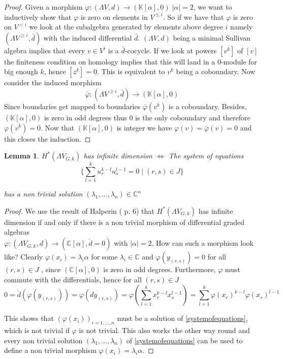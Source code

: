 \documentclass[12pt,a4paper]{scrartcl}
\newtheorem{Lemma}[Theorem]{Lemma}
\numberwithin{equation}{section}
\newcommand{\C}{\mathbb{C}} %
\newcommand{\K}{\mathbb{K}} %
\newcommand{\Sullivan}{(\Lambda V,d)}
\begin{document}
 \begin{proof}
 Given a morphism  $ \varphi : \Sullivan \to (\K[\alpha],0) \; |\alpha| = 2 $, we want to inductively show that
 $\varphi$ is zero on elements in $V^{\leq i}$. So if we have that $\varphi$ is zero on $V^{< i}$ we look at the
 subalgebra generated by elements above degree $i$ namely $(\Lambda V^{\geq i} , \bar{d})$ with the induced differential $\bar{d}$.
 $\Sullivan$ being a minimal Sullivan algebra implies that every $ v \in V^i$ is a $\bar{d}$-cocycle. If we look at powers
 $[v^k]$ of $[v]$ the finiteness condition on homology implies that this will land in a $0$-module for big enough $k$, hence 
 $[z^k] = 0$. This is equivalent to $v^k$ being a coboundary. Now consider the induced morphism
 $$ \bar{\varphi} \colon (\Lambda V^{\geq i} , \bar{d}) \to (\K[\alpha],0)$$
 Since boundaries get mapped to boundaries $\bar{\varphi}(v^k)$ is a coboundary. Besides, $(\K[\alpha],0)$ is zero in odd degrees thus
 $0$ is the only coboundary and therefore $\varphi(v^k) = 0$. Now that $(\K[\alpha],0)$ is integer we have 
 $\varphi(v)= \bar{\varphi}(v) = 0$ and this closes the induction.
   
 \end{proof}

 
\begin{Lemma}
\label{lma:cohomoly+equations}
 $H^*(\Lambda V_{G,k})$ has infinite dimension $\iff$ The system of equations \\
 \begin{equation}
 \label{systemofequations}
 {\lbrace \sum_{l = 1}^k u_r^{k - l} u_s^{l - 1} = 0 \; | \; (r,s) \in J \rbrace}  
 \end{equation}
 
 has a non trivial solution 
 $(\lambda_1 , \dotsc, \lambda_n) \in \C^n$
\end{Lemma}

\begin{proof}
 We use the result of Halperin (\cite{Halperin1988} p. 6) that $H^*(\Lambda V_{G,k})$ has infinite dimension if and only if %
 there is a non trivial morphism of differential graded algebras \\
 ${\varphi \colon (\Lambda V_{G,k},d) \to ( \C [\alpha] ,\acute{d} = 0)}$ with $|\alpha| = 2$. How can such a morphism look like?
 Clearly $\varphi(x_i) = \lambda_i \alpha$ for some $\lambda_i \in \C$ and $\varphi(y_{(r,s)}) = 0$ for all $(r,s) \in J$ , since 
 $(\C [\alpha] , 0)$ is zero in odd degrees. Furthermore, $\varphi$ must commute with the differentials, hence 
 for all $(r,s) \in J$
 $$ 0 = \acute{d} (\varphi(y_{(r,s)})) = \varphi(dy_{(r,s)}) = \varphi(\sum_{l = 1}^k x_r^{k -l} x_s^{l - 1})
 = \sum_{l = 1}^k \varphi(x_r)^{k -l} \varphi(x_s)^{l - 1}$$
 
 This shows that $(\varphi(x_i))_{i = 1, \dotsc , n}$ must be a solution of \ref{systemofequations}, which is not trivial
 if $\varphi$ is not trivial.
 This also works the other way round and every non trivial solution  $(\lambda_1 , \dotsc, \lambda_n)$ of \ref{systemofequations}
 can be used to define a non trivial morphism $\varphi(x_i) = \lambda_i \alpha$.
 \end{proof}
\end{document}
